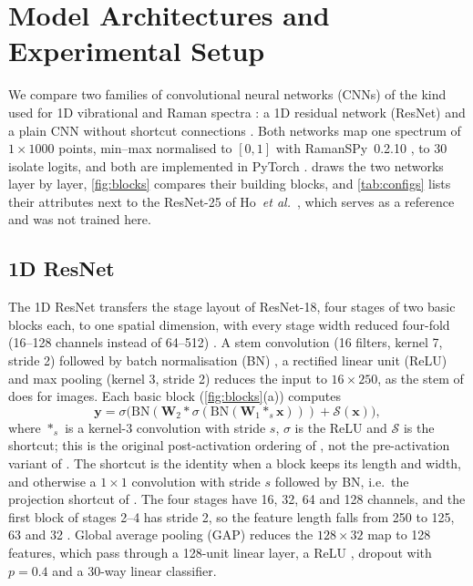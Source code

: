 \documentclass[journal,onecolumn]{IEEEtran}
\begin{document}
\section{Model Architectures and Experimental Setup}
\label{sec:models}

We compare two families of convolutional neural networks (CNNs)
\cite{lecun1998gradient} of the kind used for 1D vibrational and Raman
spectra \cite{acquarelli2017convolutional,liu2017deep,deng2022scale}: a 1D
residual network (ResNet) \cite{he2016deep} and a plain CNN without
shortcut connections \cite{lecun1998gradient}. Both networks map one
spectrum of $1{\times}1000$ points, min--max normalised to $[0,1]$ with
RamanSPy~0.2.10 \cite{georgiev2024ramanspy}, to 30 isolate logits, and both
are implemented in PyTorch \cite{paszke2019pytorch}.  draws
the two networks layer by layer, \cref{fig:blocks} compares their building
blocks, and \cref{tab:configs} lists their attributes next to the ResNet-25
of Ho~\textit{et al.}\ \cite{ho2019rapid,ho2019bacteriaid}, which serves as a
reference and was not trained here.

\subsection{1D ResNet}
\label{sec:models-resnet}
The 1D ResNet transfers the stage layout of ResNet-18, four stages of two
basic blocks each, to one spatial dimension, with every stage width reduced
four-fold (16--128 channels instead of 64--512) \cite{he2016deep}. A stem
convolution (16 filters, kernel 7, stride 2) followed by batch
normalisation (BN) \cite{ioffe2015batch}, a rectified linear unit (ReLU)
\cite{nair2010rectified} and max pooling (kernel 3, stride 2) reduces the
input to $16{\times}250$, as the stem of \cite{he2016deep} does for images.
Each basic block (\cref{fig:blocks}(a)) computes
\begin{equation}
  \mathbf{y} = \sigma\!\bigl(\mathrm{BN}(\mathbf{W}_2 * \sigma(\mathrm{BN}(\mathbf{W}_1 *_s \mathbf{x})))
               + \mathcal{S}(\mathbf{x})\bigr),
  \label{eq:block}
\end{equation}
where $*_s$ is a kernel-3 convolution with stride $s$, $\sigma$ is the ReLU
and $\mathcal{S}$ is the shortcut; this is the original post-activation
ordering of \cite{he2016deep}, not the pre-activation variant of
\cite{he2016identity}. The shortcut is the identity when a block keeps its
length and width, and otherwise a $1{\times}1$ convolution with stride $s$
followed by BN, i.e.\ the projection shortcut of \cite{he2016deep}. The
four stages have 16, 32, 64 and 128 channels, and the first block of
stages 2--4 has stride 2, so the feature length falls from 250 to 125, 63
and 32 \cite{he2016deep}. Global average pooling (GAP) \cite{lin2014network}
reduces the $128{\times}32$ map to 128 features, which pass through a
128-unit linear layer, a ReLU \cite{nair2010rectified}, dropout with
$p=0.4$ \cite{srivastava2014dropout} and a 30-way linear classifier.
\end{document}
